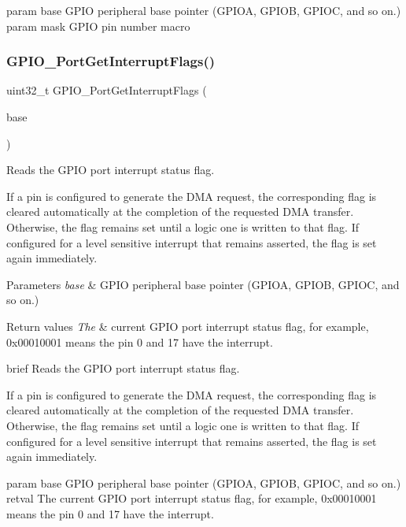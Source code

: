 param base G\+P\+IO peripheral base pointer (G\+P\+I\+OA, G\+P\+I\+OB, G\+P\+I\+OC, and so on.) param mask G\+P\+IO pin number macro \mbox{\label{group__gpio__driver_ga8685e0d5f2bc5573e9a229e9147cf143}} 
\subsubsection{\texorpdfstring{GPIO\_PortGetInterruptFlags()}{GPIO\_PortGetInterruptFlags()}}
{\footnotesize\ttfamily uint32\+\_\+t G\+P\+I\+O\+\_\+\+Port\+Get\+Interrupt\+Flags (\begin{DoxyParamCaption}\item[{\mbox{\hyperlink{struct_g_p_i_o___type}{G\+P\+I\+O\+\_\+\+Type}} $\ast$}]{base }\end{DoxyParamCaption})}



Reads the G\+P\+IO port interrupt status flag. 

If a pin is configured to generate the D\+MA request, the corresponding flag is cleared automatically at the completion of the requested D\+MA transfer. Otherwise, the flag remains set until a logic one is written to that flag. If configured for a level sensitive interrupt that remains asserted, the flag is set again immediately.


\begin{DoxyParams}{Parameters}
{\em base} & G\+P\+IO peripheral base pointer (G\+P\+I\+OA, G\+P\+I\+OB, G\+P\+I\+OC, and so on.) \\
\hline
\end{DoxyParams}

\begin{DoxyRetVals}{Return values}
{\em The} & current G\+P\+IO port interrupt status flag, for example, 0x00010001 means the pin 0 and 17 have the interrupt.\\
\hline
\end{DoxyRetVals}
brief Reads the G\+P\+IO port interrupt status flag.

If a pin is configured to generate the D\+MA request, the corresponding flag is cleared automatically at the completion of the requested D\+MA transfer. Otherwise, the flag remains set until a logic one is written to that flag. If configured for a level sensitive interrupt that remains asserted, the flag is set again immediately.

param base G\+P\+IO peripheral base pointer (G\+P\+I\+OA, G\+P\+I\+OB, G\+P\+I\+OC, and so on.) retval The current G\+P\+IO port interrupt status flag, for example, 0x00010001 means the pin 0 and 17 have the interrupt. 